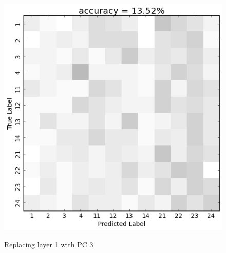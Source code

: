 \begin{figure}[h] 
  \begin{center}
    \includegraphics[scale=0.5]{Figures/PC3_confusion}
   \\\vspace{-0.8em}
    \caption{Replacing layer 1 with PC 3}
    \label{fig:PC3_confusion}
  \end{center}
  \vspace{-1em}
\end{figure}